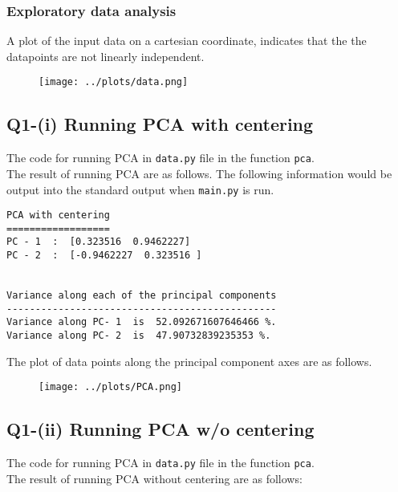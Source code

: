 \subsubsection*{Exploratory data analysis}

A plot of the input data on a cartesian coordinate, indicates that the the datapoints are not linearly independent.

\begin{figure}[!ht]
	\centering
	\texttt{[image: ../plots/data.png]}
\end{figure}


\pagebreak


\subsection*{Q1-(i) Running PCA with centering}

The code for running PCA in \texttt{data.py} file in the function \texttt{pca}. \\

The result of running PCA are as follows. The following information would be output into the standard output when \texttt{main.py} is run.

\begin{verbatim}
PCA with centering
==================
PC - 1  :  [0.323516  0.9462227]
PC - 2  :  [-0.9462227  0.323516 ]


Variance along each of the principal components
-----------------------------------------------
Variance along PC- 1  is  52.092671607646466 %.
Variance along PC- 2  is  47.90732839235353 %.	
\end{verbatim}

The plot of data points along the principal component axes are as follows.

\begin{figure}[!ht]
	\centering
	\texttt{[image: ../plots/PCA.png]}
\end{figure}

\subsection*{Q1-(ii) Running PCA w/o centering}

The code for running PCA in \texttt{data.py} file in the function \texttt{pca}. \\

The result of running PCA without centering are as follows:

